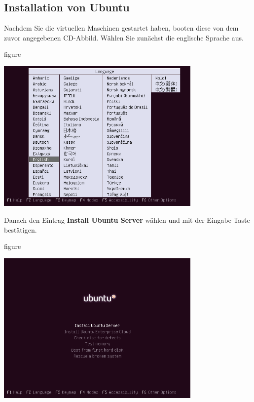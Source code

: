 \subsection{Installation von Ubuntu}
Nachdem Sie die virtuellen Maschinen gestartet haben, booten diese von dem zuvor angegebenen CD-Abbild. Wählen Sie zunächst die
englische Sprache aus. 
\begin{nofloat}{figure}
\begin{center}
\includegraphics[width=0.75\textwidth]{screenshots/01_ubuntu_install.png}
\end{center}
\end{nofloat}

Danach den Eintrag \textbf{Install Ubuntu Server} wählen und mit der
Eingabe-Taste bestätigen.

\begin{nofloat}{figure}
\begin{center}
\includegraphics[width=0.75\textwidth]{screenshots/02_ubuntu_install.png}
\end{center}
\end{nofloat}

